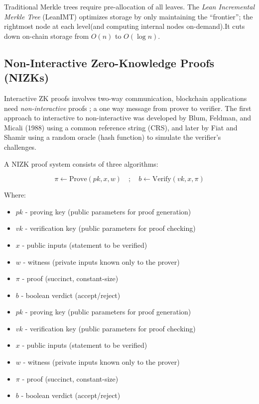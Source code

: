 \documentclass[12pt, a4paper]{report}
\begin{document}
Traditional Merkle trees require pre-allocation of all leaves. The \textit{Lean Incremental Merkle Tree} (LeanIMT) optimizes storage by only maintaining the ``frontier''; the rightmost node at each level(and computing internal nodes on-demand).It cuts down on-chain storage from $O(n)$ to $O(\log n)$.

\subsection{Non-Interactive Zero-Knowledge Proofs (NIZKs)}

Interactive ZK proofs \cite{goldwasser1985knowledge} involves two-way communication, blockchain applications need \textit{non-interactive} proofs ; a one way message from prover to verifier. The first approach to interactive to non-interactive was developed by Blum, Feldman, and Micali (1988) \cite{blum1988noninteractive} using a common reference string (CRS), and later by Fiat and Shamir \cite{fiat1986prove} using a random oracle (hash function) to simulate the verifier's challenges.

A NIZK proof system consists of three algorithms:

\begin{equation}
\pi \leftarrow \text{Prove}(pk, x, w) \quad ; \quad b \leftarrow \text{Verify}(vk, x, \pi)
\label{eq:nizk}
\end{equation}

Where:
\begin{itemize}
    \item $pk$ - proving key (public parameters for proof generation)
    \item $vk$ - verification key (public parameters for proof checking)
    \item $x$ - public inputs (statement to be verified)
    \item $w$ - witness (private inputs known only to the prover)
    \item $\pi$ - proof (succinct, constant-size)
    \item $b$ - boolean verdict (accept/reject)
    \item $pk$ - proving key (public parameters for proof generation)
    \item $vk$ - verification key (public parameters for proof checking)
    \item $x$ - public inputs (statement to be verified)
    \item $w$ - witness (private inputs known only to the prover)
    \item $\pi$ - proof (succinct, constant-size)
    \item $b$ - boolean verdict (accept/reject)
\end{itemize}
\end{document}
